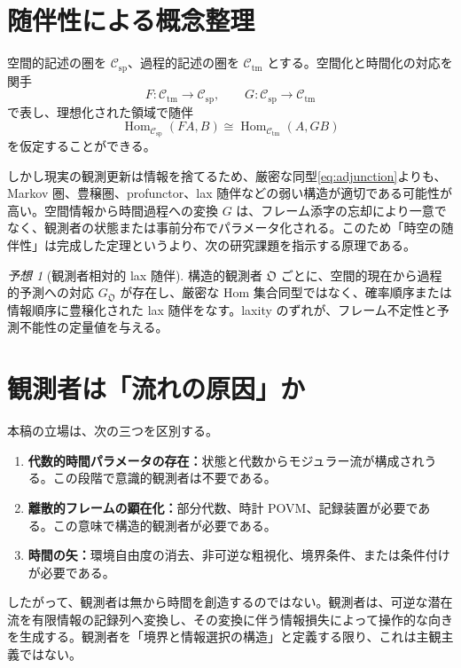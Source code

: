 \documentclass[a4paper,11pt]{ltjsarticle}
\theoremstyle{remark}
\newtheorem{conjecture}[definition]{予想}
\newcommand{\Hom}{\operatorname{Hom}}
\begin{document}
\section{随伴性による概念整理}

空間的記述の圏を $\mathcal C_{\mathrm{sp}}$、過程的記述の圏を $\mathcal C_{\mathrm{tm}}$ とする。空間化と時間化の対応を関手
\begin{equation}
 F:\mathcal C_{\mathrm{tm}}\to\mathcal C_{\mathrm{sp}},
 \qquad
 G:\mathcal C_{\mathrm{sp}}\to\mathcal C_{\mathrm{tm}}
\end{equation}
で表し、理想化された領域で随伴
\begin{equation}
 \Hom_{\mathcal C_{\mathrm{sp}}}(F A,B)
 \cong
 \Hom_{\mathcal C_{\mathrm{tm}}}(A,G B)
 \label{eq:adjunction}
\end{equation}
を仮定することができる。

しかし現実の観測更新は情報を捨てるため、厳密な同型\eqref{eq:adjunction}よりも、Markov 圏、豊穣圏、profunctor、lax 随伴などの弱い構造が適切である可能性が高い。空間情報から時間過程への変換 $G$ は、フレーム添字の忘却により一意でなく、観測者の状態または事前分布でパラメータ化される。このため「時空の随伴性」は完成した定理というより、次の研究課題を指示する原理である。

\begin{conjecture}[観測者相対的 lax 随伴]
構造的観測者 $\mathfrak O$ ごとに、空間的現在から過程的予測への対応 $G_{\mathfrak O}$ が存在し、厳密な Hom 集合同型ではなく、確率順序または情報順序に豊穣化された lax 随伴をなす。laxity のずれが、フレーム不定性と予測不能性の定量値を与える。
\end{conjecture}

\section{観測者は「流れの原因」か}

本稿の立場は、次の三つを区別する。
\begin{enumerate}
  \item \textbf{代数的時間パラメータの存在：}状態と代数からモジュラー流が構成されうる。この段階で意識的観測者は不要である。
  \item \textbf{離散的フレームの顕在化：}部分代数、時計 POVM、記録装置が必要である。この意味で構造的観測者が必要である。
  \item \textbf{時間の矢：}環境自由度の消去、非可逆な粗視化、境界条件、または条件付けが必要である。
\end{enumerate}
したがって、観測者は無から時間を創造するのではない。観測者は、可逆な潜在流を有限情報の記録列へ変換し、その変換に伴う情報損失によって操作的な向きを生成する。観測者を「境界と情報選択の構造」と定義する限り、これは主観主義ではない。
\end{document}
